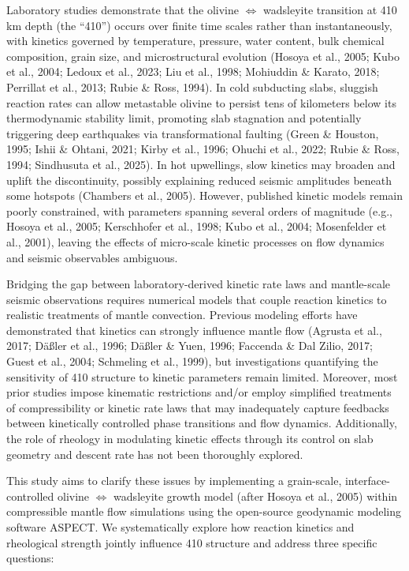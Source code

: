 \documentclass[draft,linenumbers]{agujournal2019}
\begin{document}
Laboratory studies demonstrate that the olivine \(\Leftrightarrow\)
wadsleyite transition at 410 km depth (the ``410'') occurs over finite
time scales rather than instantaneously, with kinetics governed by
temperature, pressure, water content, bulk chemical composition, grain
size, and microstructural evolution (Hosoya et al., 2005; Kubo et al.,
2004; {Ledoux et al.}, 2023; Liu et al., 1998; Mohiuddin \& Karato,
2018; Perrillat et al., 2013; Rubie \& Ross, 1994). In cold subducting
slabs, sluggish reaction rates can allow metastable olivine to persist
tens of kilometers below its thermodynamic stability limit, promoting
slab stagnation and potentially triggering deep earthquakes via
transformational faulting (Green \& Houston, 1995; Ishii \& Ohtani,
2021; Kirby et al., 1996; Ohuchi et al., 2022; Rubie \& Ross, 1994;
Sindhusuta et al., 2025). In hot upwellings, slow kinetics may broaden
and uplift the discontinuity, possibly explaining reduced seismic
amplitudes beneath some hotspots (Chambers et al., 2005). However,
published kinetic models remain poorly constrained, with parameters
spanning several orders of magnitude (e.g., Hosoya et al., 2005;
Kerschhofer et al., 1998; Kubo et al., 2004; Mosenfelder et al., 2001),
leaving the effects of micro-scale kinetic processes on flow dynamics
and seismic observables ambiguous.

Bridging the gap between laboratory-derived kinetic rate laws and
mantle-scale seismic observations requires numerical models that couple
reaction kinetics to realistic treatments of mantle convection. Previous
modeling efforts have demonstrated that kinetics can strongly influence
mantle flow (Agrusta et al., 2017; Däßler et al., 1996; Däßler \& Yuen,
1996; Faccenda \& Dal Zilio, 2017; Guest et al., 2004; Schmeling et al.,
1999), but investigations quantifying the sensitivity of 410 structure
to kinetic parameters remain limited. Moreover, most prior studies
impose kinematic restrictions and/or employ simplified treatments of
compressibility or kinetic rate laws that may inadequately capture
feedbacks between kinetically controlled phase transitions and flow
dynamics. Additionally, the role of rheology in modulating kinetic
effects through its control on slab geometry and descent rate has not
been thoroughly explored.

This study aims to clarify these issues by implementing a grain-scale,
interface-controlled olivine \(\Leftrightarrow\) wadsleyite growth model
(after Hosoya et al., 2005) within compressible mantle flow simulations
using the open-source geodynamic modeling software ASPECT. We
systematically explore how reaction kinetics and rheological strength
jointly influence 410 structure and address three specific questions:
\end{document}
